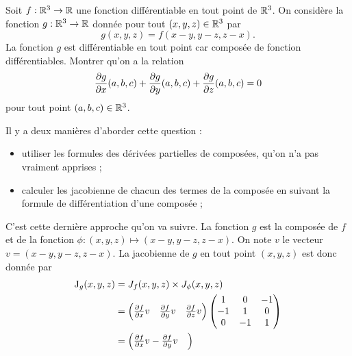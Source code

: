 \documentclass[11pt, a4paper]{article}
\begin{document}
\begin{question}
  Soit $f : \mathbb{R}^3 \to \mathbb{R}$ une fonction différentiable en tout point de
  $\mathbb{R}^3$. On considère la fonction $g : \mathbb{R}^3 \to \mathbb{R}$ donnée pour tout
  $(x, y, z) \in \mathbb{R}^3$ par
  \[
  g(x, y, z) = f(x-y, y-z, z-x).
  \]
  La fonction $g$ est différentiable en tout point car composée de
  fonction différentiables. Montrer qu'on a la relation
  \[
  \frac{\partial g}{\partial x}(a,b, c) + \frac{\partial g}{\partial y}(a, b, c) + \frac{\partial
    g}{\partial z}(a, b, c) = 0
  \]
  pour tout point $(a, b, c) \in \mathbb{R}^3$.
\end{question}

\begin{solution}
  Il y a deux manières d'aborder cette question :
  \begin{itemize}
  \item[\textbullet]
    utiliser les formules des dérivées partielles de composées, qu'on
    n'a pas vraiment apprises ;
  \item[\textbullet]
    calculer les jacobienne de chacun des termes de la composée en
    suivant la formule de différentiation d'une composée ;
  \end{itemize}
  C'est cette dernière approche qu'on va suivre. La fonction $g$ est
  la composée de $f$ et de la fonction
  $\phi : (x, y, z) \mapsto (x-y, y-z, z-x)$. On note $v$ le vecteur
  $v = (x-y, y-z, z-x)$. La jacobienne de $g$ en tout point
  $(x, y, z)$ est donc donnée par
  \begin{align}
    \mathrm{J}_g(x, y, z) & = J_{f}(x, y, z)\times J_\phi(x, y, z)\\
                          & =
                            \begin{pmatrix}
                              \frac{\partial f}{\partial x}v &
                              \frac{\partial f}{\partial y}v &
                              \frac{\partial f}{\partial z}v
                            \end{pmatrix}
                            \begin{pmatrix}
                              1 & 0 & -1 \\
                              -1 & 1 & 0 \\
                              0 & -1 & 1
                            \end{pmatrix}\\
                          & =
                            \begin{pmatrix}
                              \frac{\partial f}{\partial x}v
                              - \frac{\partial f}{\partial y}v &

\end{pmatrix}
\end{align}
\end{solution}
\end{document}
